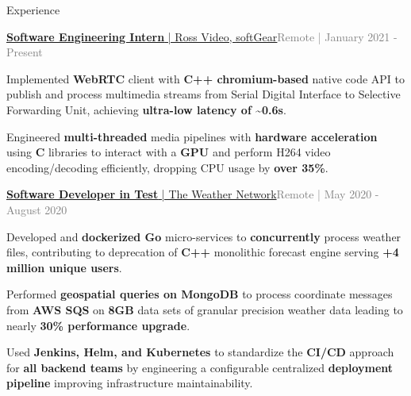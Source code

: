 \documentclass[hidelinks]{resume} %
\begin{document}
\begin{rSection}{Experience}
\begin{rSubsection}{\href{https://www.rossvideo.com/products-services/infrastructure/softgear-software-based-signal-processing-platform/}{\textbf{Software Engineering Intern}{ | Ross Video, \underline{softGear}}}}{\textcolor{gray}{Remote | January 2021 - Present}}{}

    \begin{bulletpoints}
        \vspace{-.10cm}
        \item Implemented \textbf{WebRTC} client with \textbf{C++ chromium-based} native code API to publish and process multimedia streams from Serial Digital Interface to Selective Forwarding Unit, achieving \textbf{ultra-low latency of \textasciitilde0.6s}.
        \vspace{-.13cm}
        \item Engineered \textbf{multi-threaded} media pipelines with \textbf{hardware acceleration} using \textbf{C} libraries to interact with a \textbf{GPU} and perform H264 video encoding/decoding efficiently, dropping CPU usage by \textbf{over 35\%}.
        \vspace{-.10cm}
    \end{bulletpoints}
    \vspace{-.25cm}
\end{rSubsection}
\begin{rSubsection}{\href{https://www.theweathernetwork.com/}{\textbf{Software Developer in Test}{ | The Weather Network}}}{\textcolor{gray}{Remote | May 2020 - August 2020}}{}
        \par
        \begin{bulletpoints}
            \vspace{-.10cm}
            \item Developed and \textbf{dockerized Go} micro-services to \textbf{concurrently} process weather files, contributing to deprecation of \textbf{C++} monolithic forecast engine serving \textbf{+4 million unique users}.
             \vspace{-.13cm}
            \item Performed \textbf{geospatial queries on MongoDB} to process coordinate messages from \textbf{AWS SQS} on \textbf{8GB} data sets of granular precision weather data leading to nearly \textbf{30\% performance upgrade}.
            \vspace{-.13cm}
             \item Used \textbf{Jenkins, Helm, and Kubernetes} to standardize the \textbf{CI/CD} approach for \textbf{all backend teams} by engineering a configurable centralized \textbf{deployment pipeline} improving infrastructure maintainability.

\end{bulletpoints}
\end{rSubsection}
\end{rSection}
\end{document}
